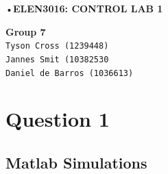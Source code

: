 \documentclass[12pt]{article}
\begin{document}
\begin{Huge}

\begin{center}
•\textbf{ELEN3016: CONTROL LAB 1}\\
\end{center}
\end{Huge}\textbf{Group 7}\\\texttt{Tyson Cross (1239448)\\
Jannes Smit (10382530\\
Daniel de Barros (1036613)\\
}\section{Question 1}
\subsection{Matlab Simulations}
\end{document}
